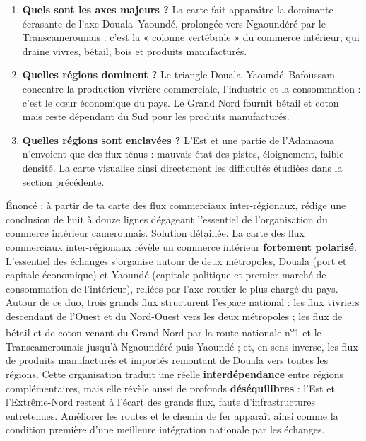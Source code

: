 \documentclass[11pt]{article}
\begin{document}
\begin{enumerate}
\item \textbf{Quels sont les axes majeurs ?} La carte fait apparaître la dominante écrasante de l'axe Douala--Yaoundé, prolongée vers Ngaoundéré par le Transcamerounais : c'est la « colonne vertébrale » du commerce intérieur, qui draine vivres, bétail, bois et produits manufacturés.
\item \textbf{Quelles régions dominent ?} Le triangle Douala--Yaoundé--Bafoussam concentre la production vivrière commerciale, l'industrie et la consommation : c'est le cœur économique du pays. Le Grand Nord fournit bétail et coton mais reste dépendant du Sud pour les produits manufacturés.
\item \textbf{Quelles régions sont enclavées ?} L'Est et une partie de l'Adamaoua n'envoient que des flux ténus : mauvais état des pistes, éloignement, faible densité. La carte visualise ainsi directement les difficultés étudiées dans la section précédente.
\end{enumerate}

\begin{exoresolu}
Énoncé : à partir de ta carte des flux commerciaux inter-régionaux, rédige une conclusion de huit à douze lignes dégageant l'essentiel de l'organisation du commerce intérieur camerounais.
\tcblower
Solution détaillée. La carte des flux commerciaux inter-régionaux révèle un commerce intérieur \textbf{fortement polarisé}. L'essentiel des échanges s'organise autour de deux métropoles, Douala (port et capitale économique) et Yaoundé (capitale politique et premier marché de consommation de l'intérieur), reliées par l'axe routier le plus chargé du pays. Autour de ce duo, trois grands flux structurent l'espace national : les flux vivriers descendant de l'Ouest et du Nord-Ouest vers les deux métropoles ; les flux de bétail et de coton venant du Grand Nord par la route nationale n\textsuperscript{o}1 et le Transcamerounais jusqu'à Ngaoundéré puis Yaoundé ; et, en sens inverse, les flux de produits manufacturés et importés remontant de Douala vers toutes les régions. Cette organisation traduit une réelle \textbf{interdépendance} entre régions complémentaires, mais elle révèle aussi de profonds \textbf{déséquilibres} : l'Est et l'Extrême-Nord restent à l'écart des grands flux, faute d'infrastructures entretenues. Améliorer les routes et le chemin de fer apparaît ainsi comme la condition première d'une meilleure intégration nationale par les échanges.
\end{exoresolu}
\end{document}

